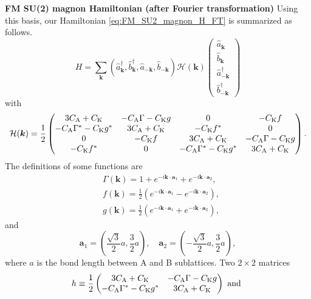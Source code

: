 \documentclass[11pt, aps, longbibliography]{article}
\begin{document}
\begin{tcolorbox}
    \textbf{FM SU(2) magnon Hamiltonian (after Fourier transformation)}
    Using this basis, our Hamiltonian \eqref{eq:FM_SU2_magnon_H_FT} is summarized as follows.
    \begin{equation}\label{eq:BdG-form}
        H = \sum_{\bm{k}}\left( \hat{a}^\dagger_{\bm{k}}, \hat{b}^\dagger_{\bm{k}}, \hat{a}_{-\bm{k}}, \hat{b}_{-\bm{k}}\right) \mathcal{H}(\bm{k}) \begin{pmatrix}
            \hat{a}_{\bm{k}} \\ \hat{b}_{\bm{k}} \\ \hat{a}_{-\bm{k}}^\dagger \\ \hat{b}_{-\bm{k}}^\dagger
        \end{pmatrix}
    \end{equation}
    with 
    \begin{equation}
        \mathcal{H}(\bm{k}) = \frac{1}{2}\begin{pmatrix}
            3C_{\rm A} + C_{\rm K} & -C_{\rm A}\Gamma-C_{\rm K}g & 0 & -C_{\rm K}f \\
            -C_{\rm A}\Gamma^* - C_{\rm K}g^* & 3C_{\rm A} + C_{\rm K} & -C_{\rm K}f^* & 0 \\
            0 & -C_{\rm K}f & 3C_{\rm A} + C_{\rm K} & -C_{\rm A}\Gamma - C_{\rm K}g \\
            -C_{\rm K}f^* & 0 & -C_{\rm A}\Gamma^*-C_{\rm K}g^* & 3C_{\rm A} + C_{\rm K}
        \end{pmatrix}.
    \end{equation}
    The definitions of some functions are
    \begin{align}
        &\Gamma(\bm{k}) = 1+e^{-i\bm{k}\cdot \bm{a}_1}+e^{-i\bm{k}\cdot \bm{a}_2}, \\
        &f(\bm{k}) = \frac{1}{2}\left( e^{-i\bm{k}\cdot\bm{a}_1} - e^{-i\bm{k}\cdot\bm{a}_2} \right), \\
        &g(\bm{k}) = \frac{1}{2}\left( e^{-i\bm{k}\cdot\bm{a}_1} + e^{-i\bm{k}\cdot\bm{a}_2} \right),
    \end{align}
    and 
    \begin{equation}
        \bm{a}_1 = \left( \frac{\sqrt{3}}{2}a, \frac{3}{2}a \right), \quad \bm{a}_2 = \left( -\frac{\sqrt{3}}{2}a, \frac{3}{2}a \right),
    \end{equation}
    where $a$ is the bond length between A and B sublattices.
    Two $2\times 2$ matrices 
    \begin{equation}
        h \equiv \frac{1}{2}\begin{pmatrix} 3C_{\rm A} + C_{\rm K} & -C_{\rm A}\Gamma-C_{\rm K}g \\ -C_{\rm A}\Gamma^* - C_{\rm K}g^* & 3C_{\rm A} + C_{\rm K} \end{pmatrix} \ \text{and} \ 

\end{equation}
\end{tcolorbox}
\end{document}
